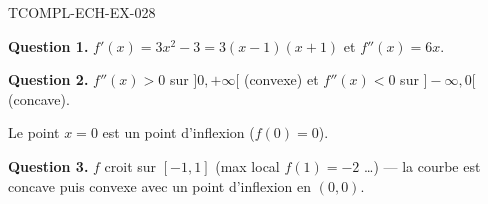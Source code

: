 \begin{corrige}{TCOMPL-ECH-EX-028}

\textbf{Question 1.} $f'(x) = 3x^2 - 3 = 3(x-1)(x+1)$ et $f''(x) = 6x$.


\textbf{Question 2.} $f''(x) > 0$ sur $]0,+\infty[$ (convexe) et $f''(x) < 0$ sur $]-\infty,0[$ (concave).

Le point $x=0$ est un point d'inflexion ($f(0) = 0$).

\textbf{Question 3.} $f$ croit sur $[-1,1]$ (max local $f(1)=-2$ \ldots) — la courbe est concave puis convexe avec un point d'inflexion en $(0,0)$.

\end{corrige}
